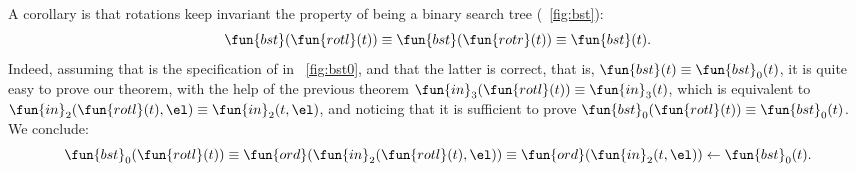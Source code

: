 A corollary is that rotations keep invariant the property of being a
binary search tree (\fig~\vref{fig:bst}):
\begin{equation*}
\fun{bst}(\fun{rotl}(t)) \equiv \fun{bst}(\fun{rotr}(t)) \equiv \fun{bst}(t).
\end{equation*}
Indeed, assuming that  is the specification of
 in \fig~\vref{fig:bst0}, and that the latter is
correct, that is, \(\fun{bst}(t) \equiv \fun{bst}_0(t)\), it is quite
easy to prove our theorem, with the help of the previous theorem
\(\fun{in}_3(\fun{rotl}(t)) \equiv \fun{in}_3(t)\), which is
equivalent to \(\fun{in}_2(\fun{rotl}(t),\el) \equiv
\fun{in}_2(t,\el)\), and noticing that it is sufficient to prove
\(\fun{bst}_0(\fun{rotl}(t)) \equiv \fun{bst}_0(t)\). We conclude:
\begin{equation*}
\fun{bst}_0(\fun{rotl}(t))
\equiv \fun{ord}(\fun{in}_2(\fun{rotl}(t),\el))
\equiv \fun{ord}(\fun{in}_2(t,\el))
\leftarrow \fun{bst}_0(t).
\end{equation*}


